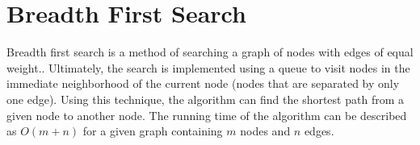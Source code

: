 \section{Breadth First Search}

Breadth first search is a method of searching a graph of nodes with edges of equal weight..
Ultimately, the search is implemented using a queue to visit nodes in the immediate neighborhood of the current node (nodes that are separated by only one edge).
Using this technique, the algorithm can find the shortest path from a given node to another node.
The running time of the algorithm can be described as $O(m + n)$ for a given graph containing $m$ nodes and $n$ edges.
